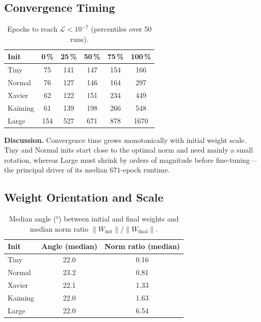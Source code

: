 \subsection*{Convergence Timing}

\begin{table}[h]
\centering
\caption{Epochs to reach $\mathcal L<10^{-7}$ (percentiles over 50 runs).}
\label{tab:abs1-init-epochs}
\begin{tabular}{lccccc}
\toprule
Init & 0\,\% & 25\,\% & 50\,\% & 75\,\% & 100\,\% \\
\midrule
Tiny    & 75  & 141 & 147 & 154 & 166 \\
Normal  & 76  & 127 & 146 & 164 & 297 \\
Xavier  & 62  & 122 & 151 & 234 & 449 \\
Kaiming & 61  & 139 & 198 & 266 & 548 \\
Large   & 154 & 527 & 671 & 878 & 1670 \\
\bottomrule
\end{tabular}
\end{table}

\textbf{Discussion.}  
Convergence time grows monotonically with initial weight scale.  Tiny and
Normal inits start close to the optimal norm and need mainly a small rotation,
whereas Large must shrink by orders of magnitude before fine-tuning—the
principal driver of its median $671$-epoch runtime.

\subsection*{Weight Orientation and Scale}

\begin{table}[h]
\centering
\caption{Median angle (°) between initial and final weights and median
norm ratio $\lVert W_{\text{init}}\rVert / \lVert W_{\text{final}}\rVert$.}
\label{tab:abs1-init-angle-norm}
\begin{tabular}{lcc}
\toprule
Init & Angle (median) & Norm ratio (median) \\
\midrule
Tiny    & 22.0 & 0.16 \\
Normal  & 23.2 & 0.81 \\
Xavier  & 22.1 & 1.33 \\
Kaiming & 22.0 & 1.63 \\
Large   & 22.0 & 6.54 \\
\bottomrule
\end{tabular}
\end{table}

